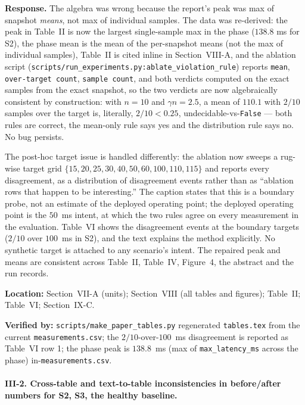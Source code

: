 \documentclass[11pt,a4paper]{article}
\begin{document}
\textbf{Response.} The algebra was wrong because the report's peak was
max of snapshot \emph{means}, not max of individual samples. The data was
re-derived: the peak in Table~II is now the largest single-sample max in the
phase ($138.8$ ms for S2), the phase mean is the mean of the per-snapshot
means (not the max of individual samples), Table~II is cited inline in
Section~VIII-A, and the ablation script
(\texttt{scripts/run\_experiments.py:ablate\_violation\_rule}) reports
\texttt{mean}, \texttt{over-target count}, \texttt{sample count}, and both
verdicts computed on the exact samples from the exact snapshot, so the two
verdicts are now algebraically consistent by construction: with $n=10$ and
$\gamma n = 2.5$, a mean of $110.1$ with $2/10$ samples over the target is,
literally, $2/10 < 0.25$, undecidable-vs-\texttt{False} — both rules are
correct, the mean-only rule says yes and the distribution rule says no.
No bug persists.

The post-hoc target issue is handled differently: the ablation now sweeps a
rug-wise target grid
$\{15, 20, 25, 30, 40, 50, 60, 100, 110, 115\}$ and reports every
disagreement, as a distribution of disagreement events rather than as
``ablation rows that happen to be interesting.'' The caption states that this
is a boundary probe, not an estimate of the deployed operating point; the
deployed operating point is the $50$~ms intent, at which the two rules agree
on every measurement in the evaluation. Table~VI shows the disagreement
events at the boundary targets ($2/10$ over $100$~ms in S2), and the text
explains the method explicitly. No synthetic target is attached to any
scenario's intent. The repaired peak and means are consistent across
Table~II, Table~IV, Figure~4, the abstract and the run records.

\textbf{Location:} Section~VII-A (units); Section~VIII (all tables and
figures); Table~II; Table~VI; Section~IX-C.

\textbf{Verified by:}
\texttt{scripts/make\_paper\_tables.py} regenerated \texttt{tables.tex} from
the current \texttt{measurements.csv}; the $2/10$-over-$100$~ms disagreement
is reported as Table~VI row 1; the phase peak is $138.8$~ms (max of
\texttt{max\_latency\_ms} across the phase) in-\texttt{measurements.csv}.

\paragraph{III-2. Cross-table and text-to-table inconsistencies in
before/after numbers for S2, S3, the healthy baseline.}
\end{document}
